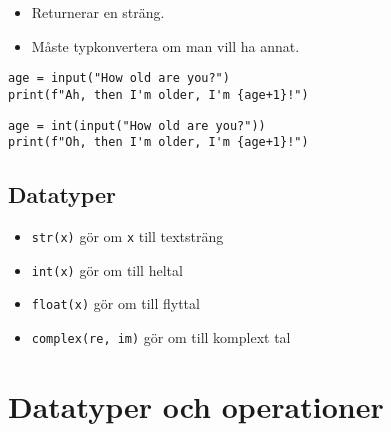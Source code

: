 \begin{frame}
  \begin{remark}
    \begin{itemize}
      \item Returnerar en sträng.
      \item Måste typkonvertera om man vill ha annat.
    \end{itemize}
  \end{remark}
\end{frame}

\begin{frame}[fragile]
  \begin{example}
    \begin{lstlisting}
age = input("How old are you?")
print(f"Ah, then I'm older, I'm {age+1}!")
    \end{lstlisting}
  \end{example}

  \pause

  \begin{example}[Funkar]
    \begin{lstlisting}
age = int(input("How old are you?"))
print(f"Oh, then I'm older, I'm {age+1}!")
    \end{lstlisting}
  \end{example}
\end{frame}

\subsection{Datatyper}

\begin{frame}
  \begin{remark}
    \begin{itemize}
      \item \lstinline{str(x)} gör om \lstinline{x} till textsträng
      \item \lstinline{int(x)} gör om till heltal
      \item \lstinline{float(x)} gör om till flyttal
      \item \lstinline{complex(re, im)} gör om till komplext tal
    \end{itemize}
  \end{remark}
\end{frame}


\section{Datatyper och operationer}

